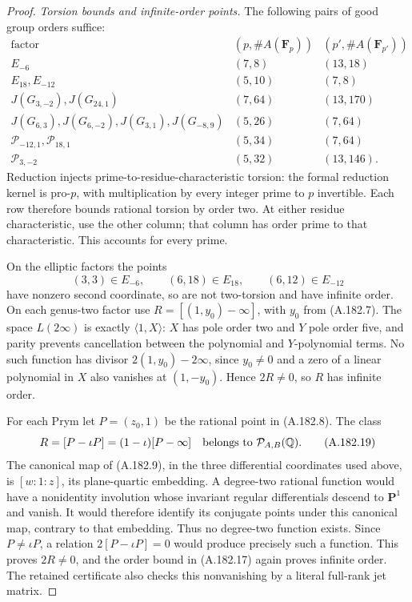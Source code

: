 \begin{proof}
\emph{Torsion bounds and infinite-order points.}
The following pairs of good group orders suffice:
\[
\begin{array}{c|c|c}
\text{factor}&(p,\#A(\mathbf F_p))&(p',\#A(\mathbf F_{p'}))\\ \hline
E_{-6}&(7,8)&(13,18)\\
E_{18},E_{-12}&(5,10)&(7,8)\\
J(G_{3,-2}),J(G_{24,1})&(7,64)&(13,170)\\
J(G_{6,3}),J(G_{6,-2}),J(G_{3,1}),J(G_{-8,9})&(5,26)&(7,64)\\
\mathcal P_{-12,1},\mathcal P_{18,1}&(5,34)&(7,64)\\
\mathcal P_{3,-2}&(5,32)&(13,146).
\end{array}
\tag{A.182.17}
\]
Reduction injects prime-to-residue-characteristic torsion:
the formal reduction kernel is pro-\(p\), with multiplication
by every integer prime to \(p\) invertible.  Each row therefore
bounds rational torsion by order two.  At either residue
characteristic, use the other column; that column has order
prime to that characteristic.  This accounts for every prime.

On the elliptic factors the points
\[
                  (3,3)\in E_{-6},\qquad
                  (6,18)\in E_{18},\qquad
                  (6,12)\in E_{-12}
\tag{A.182.18}
\]
have nonzero second coordinate, so are not two-torsion and
have infinite order.  On each genus-two factor use
\(R=[(1,y_0)-\infty]\), with \(y_0\) from (A.182.7).
The space \(L(2\infty)\) is exactly
\(\langle1,X\rangle\): \(X\) has pole order two and
\(Y\) pole order five, and parity prevents cancellation
between the polynomial and \(Y\)-polynomial terms.
No such function has divisor \(2(1,y_0)-2\infty\), since
\(y_0\ne0\) and a zero of a linear polynomial in \(X\)
also vanishes at \((1,-y_0)\).  Hence \(2R\ne0\), so
\(R\) has infinite order.

For each Prym let \(P=(z_0,1)\) be the rational point in
(A.182.8).  The class
\[
       R=[P-\iota P]=(1-\iota)[P-\infty]
                          \quad\hbox{belongs to }\mathcal P_{A,B}(\mathbb Q).
\tag{A.182.19}
\]
The canonical map of (A.182.9), in the three differential
coordinates used above, is \([w:1:z]\), its plane-quartic
embedding.  A degree-two rational function would have a
nonidentity involution whose invariant regular differentials
descend to \(\mathbf P^1\) and vanish.  It would therefore
identify its conjugate points under this canonical map,
contrary to that embedding.  Thus no degree-two function
exists.  Since \(P\ne\iota P\), a relation
\(2[P-\iota P]=0\) would produce precisely such a function.
This proves \(2R\ne0\), and the order bound in (A.182.17)
again proves infinite order.  The retained certificate also
checks this nonvanishing by a literal full-rank jet matrix.


\end{proof}

